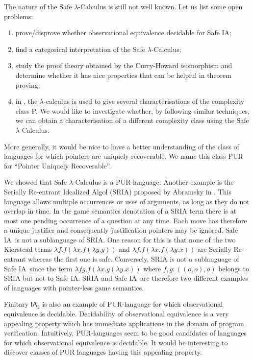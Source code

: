 \documentclass{llncs}
\newcommand\ialgol{\textsf{IA}}
\begin{document}
The nature of the Safe $\lambda$-Calculus is still not well known. Let us list some open problems:
\begin{enumerate}
\item prove/disprove whether observational equivalence decidable for Safe \ialgol;
\item find a categorical interpretation of the Safe $\lambda$-Calculus;
\item study the proof theory obtained by the Curry-Howard isomorphism and determine whether it has nice properties that can be helpful in theorem proving;
\item in \cite{DBLP:conf/tlca/LeivantM93}, the $\lambda$-calculus is used to
give several characterisations of the complexity class P. We would
like to investigate whether, by following similar techniques, we can
obtain a characterisation of a different complexity class using the
Safe $\lambda$-Calculus.
\end{enumerate}

More generally, it would be nice to have a better understanding of the class of languages for
which pointers are uniquely recoverable. We name this class PUR for
``Pointer Uniquely Recoverable''.

We showed that Safe $\lambda$-Calculus is a PUR-language. Another
example is the Serially Re-entrant Idealized Algol (SRIA) proposed
by Abramsky  in \cite{abramsky:mchecking_ia}. This language allows
multiple occurrences or uses of arguments, as long as they do not
overlap in time. In the game semantics denotation of a SRIA term
there is at most one pending occurrence of a question at any time.
Each move has therefore a unique justifier and consequently
justification pointers may be ignored. Safe \ialgol\ is not a
sublanguage of SRIA. One reason for this is that none of the two
Kierstead terms $\lambda f . f (\lambda x . f (\lambda y .y ))$ and
$\lambda f . f (\lambda x . f (\lambda y .x ))$ are Serially
Re-entrant whereas the first one is safe. Conversely, SRIA is not a
sublanguage of Safe \ialgol\ since the term $\lambda f g. f (\lambda
x . g (\lambda y .x ))$ where $f,g:((o,o),o)$ belongs to SRIA but
not to Safe \ialgol. SRIA and Safe \ialgol\ are therefore two
different examples of languages with pointer-less game semantics.

Finitary $\ialgol_2$ is also an example of PUR-language for which
observational equivalence is decidable. Decidability of observational equivalence is a very
appealing property which has immediate applications in the domain of
program verification. Intuitively, PUR-languages seem to be good
candidates of languages for which observational equivalence is
decidable. It would be interesting to discover classes of PUR
languages having this appealing property.
\end{document}
